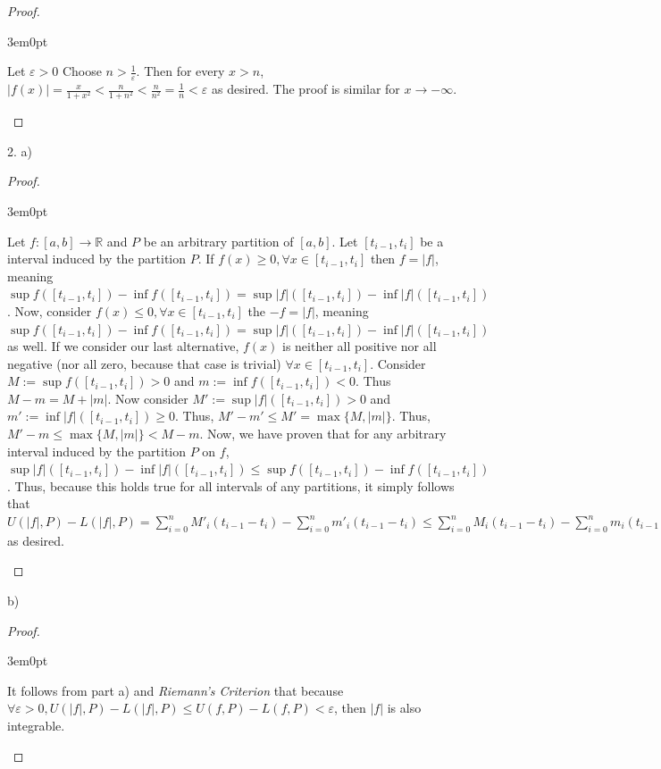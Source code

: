 \documentclass[11pt]{article}
\newcommand{\R}{\mathbb{R}}
\newenvironment{myproof}
{\begin{proof} \begin{adjustwidth}{3em}{0pt}$ $\par\nobreak\ignorespaces}
{\end{adjustwidth} \end{proof}}
\begin{document}
\begin{flushleft}
\begin{myproof}

Let $\varepsilon > 0$ Choose $n > \frac{1}{\varepsilon}$. Then for every $x > n$, $|f(x)| = \frac{x}{1+x^2} < \frac{n}{1+n^2} < \frac{n}{n^2} = \frac{1}{n} < \varepsilon$ as desired. The proof is similar for $x \to -\infty$.

\end{myproof}

\newpage

2. a)

\begin{myproof}

Let $f:[a,b] \to \R$ and $P$ be an arbitrary partition of $[a,b]$. Let $[t_{i-1},t_i]$ be a interval induced by the partition $P$. If $f(x) \geq 0, \forall x \in [t_{i-1},t_i]$ then $f = |f|$, meaning $\sup f([t_{i-1},t_i]) - \inf f([t_{i-1},t_i]) = \sup |f|([t_{i-1},t_i]) - \inf |f|([t_{i-1},t_i])$. Now, consider $f(x) \leq 0, \forall x \in [t_{i-1},t_i]$ the $-f = |f|$, meaning $\sup f([t_{i-1},t_i]) - \inf f([t_{i-1},t_i]) = \sup |f|([t_{i-1},t_i]) - \inf |f|([t_{i-1},t_i])$ as well. If we consider our last alternative, $f(x)$ is neither all positive nor all negative (nor all zero, because that case is trivial) $\forall x \in [t_{i-1},t_i]$. Consider $M := \sup f([t_{i-1},t_i])>0$ and $m := \inf f([t_{i-1},t_i])<0$. Thus $M - m = M + |m|$. Now consider $M' := \sup |f|([t_{i-1},t_i])>0$ and $m' := \inf |f|([t_{i-1},t_i]) \geq 0$. Thus, $M' - m' \leq M' = \max \{ M, |m| \}$. Thus, $M'-m \leq \max \{ M, |m| \} < M - m$. Now, we have proven that for any arbitrary interval induced by the partition $P$ on $f$, $\sup |f|([t_{i-1},t_i]) - \inf |f|([t_{i-1},t_i]) \leq  \sup f([t_{i-1},t_i]) -  \inf f([t_{i-1},t_i])$. Thus, because this holds true for all intervals of any partitions, it simply follows that $U(|f|,P) - L(|f|,P) = \sum_{i = 0}^n M'_i (t_{i-1} - t_i) - \sum_{i = 0}^n m'_i (t_{i-1} - t_i) \leq \sum_{i = 0}^n M_i (t_{i-1} - t_i) - \sum_{i = 0}^n m_i (t_{i-1} - t_i) = U(f,P) - L(f,P)$ as desired.
\end{myproof}

b)

\begin{myproof}

It follows from part a) and \textit{Riemann's Criterion} that because $\forall \varepsilon > 0,U(|f|,P) - L(|f|,P) \leq U(f,P) - L(f,P) < \varepsilon$, then $|f|$ is also integrable.

\end{myproof}


\end{flushleft}
\end{document}
